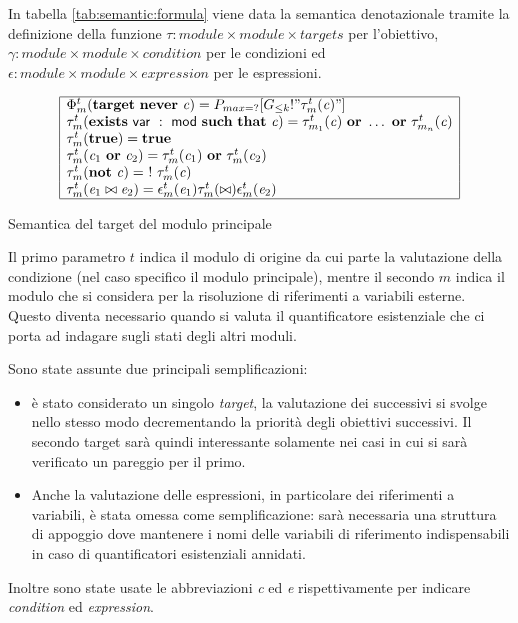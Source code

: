 In tabella \ref{tab:semantic:formula} viene data la semantica denotazionale tramite la definizione della funzione $\tau : \mathit{module} \times \mathit{module} \times \mathit{targets}$ per l'obiettivo, $\gamma : \mathit{module} \times \mathit{module} \times \mathit{condition}$ per le condizioni ed $\epsilon : \mathit{module} \times \mathit{module} \times \mathit{expression}$ per le espressioni. 
\begin{table}[htbp!]
$$
\begin{array}{|l|}
	\hline
	\Phi_m^t(\mathbf{target}\ \mathbf{never}\ \mathit{c}) = P_{max = ?}[G_{\leq k} !"\tau_m^t(\mathit{c})"] \\
	\tau_m^t(\mathbf{exists}\ \x{var}\ :\ \x{mod}\ \mathbf{such}\ \mathbf{that}\ \mathit{c}) = \tau_{m_1}^t(\mathit{c})\ \mathbf{or}\ \dots\ \mathbf{or}\ \tau_{m_n}^t(\mathit{c}) \\
	\tau_m^t(\mathbf{true}) = \mathbf{true} \\
	\tau_m^t(\mathit{c}_1\ \mathbf{or}\ \mathit{c}_2) = \tau_m^t(\mathit{c}_1)\ \mathbf{or}\ \tau_m^t(\mathit{c}_2) \\
	\tau_m^t(\mathbf{not}\ \mathit{c}) =\ !\ \tau_m^t(\mathit{c}) \\
	\tau_m^t(\mathit{e}_1 \bowtie \mathit{e}_2) = \epsilon_m^t(\mathit{e}_1) \tau_m^t(\bowtie) \epsilon_m^t(\mathit{e}_2) \\
	\hline
\end{array}
$$
\caption{Semantica del target del modulo principale}
\label{tab:semantic:formula}	
\end{table}

Il primo parametro $t$ indica il modulo di origine da cui parte la valutazione della condizione (nel caso specifico il modulo principale), mentre il secondo $m$ indica il modulo che si considera per la risoluzione di riferimenti a variabili esterne. Questo diventa necessario quando si valuta il quantificatore esistenziale che ci porta ad indagare sugli stati degli altri moduli.

Sono state assunte due principali semplificazioni:
\begin{itemize}
	\item è stato considerato un singolo \emph{target}, la valutazione dei successivi si svolge nello stesso modo decrementando la priorità degli obiettivi successivi. Il secondo target sarà quindi interessante solamente nei casi in cui si sarà verificato un pareggio per il primo.
	\item Anche la valutazione delle espressioni, in particolare dei riferimenti a variabili, è stata omessa come semplificazione: sarà necessaria una struttura di appoggio dove mantenere i nomi delle variabili di riferimento indispensabili in caso di quantificatori esistenziali annidati.
\end{itemize}
Inoltre sono state usate le abbreviazioni \emph{c} ed \emph{e} rispettivamente per indicare \emph{condition} ed \emph{expression}.

